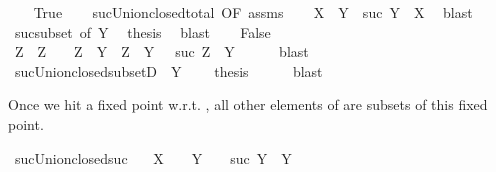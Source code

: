 \begin{isabellebody}
\ \ \isamarkupfalse%
\ True\isanewline
\ \ \isamarkupfalse%
\ suc{\isacharunderscore}{\kern0pt}Union{\isacharunderscore}{\kern0pt}closed{\isacharunderscore}{\kern0pt}total{\isacharprime}{\kern0pt}\ {\isacharbrackleft}{\kern0pt}OF\ assms{\isacharbrackright}{\kern0pt}\isanewline
\ \ \isamarkupfalse%
\ {\isachardoublequoteopen}X\ {\isasymsubseteq}\ Y\ {\isasymor}\ suc\ Y\ {\isasymsubseteq}\ X{\isachardoublequoteclose}\ \isamarkupfalse%
\ blast\isanewline
\ \ \isamarkupfalse%
\ suc{\isacharunderscore}{\kern0pt}subset\ {\isacharbrackleft}{\kern0pt}of\ Y{\isacharbrackright}{\kern0pt}\ \isamarkupfalse%
\ {\isacharquery}{\kern0pt}thesis\ \isamarkupfalse%
\ blast\isanewline
{}\isamarkupfalse%
\isanewline
\ \ \isamarkupfalse%
\ False\isanewline
\ \ \isamarkupfalse%
\ \isamarkupfalse%
\ Z\ \ {\isachardoublequoteopen}Z\ {\isasymin}\ {\isasymC}{\isachardoublequoteclose}\ \ {\isachardoublequoteopen}Z\ {\isasymsubseteq}\ Y{\isachardoublequoteclose}\ \ {\isachardoublequoteopen}Z\ {\isasymnoteq}\ Y{\isachardoublequoteclose}\ \ {\isachardoublequoteopen}{\isasymnot}\ suc\ Z\ {\isasymsubseteq}\ Y{\isachardoublequoteclose}\isanewline
\ \ \ \ \isamarkupfalse%
\ blast\isanewline
\ \ \isamarkupfalse%
\ suc{\isacharunderscore}{\kern0pt}Union{\isacharunderscore}{\kern0pt}closed{\isacharunderscore}{\kern0pt}subsetD\ \ {\isacartoucheopen}Y\ {\isasymin}\ {\isasymC}{\isacartoucheclose}\ \isamarkupfalse%
\ {\isacharquery}{\kern0pt}thesis\isanewline
\ \ \ \ \isamarkupfalse%
\ blast\isanewline
{}\isamarkupfalse%
%
\endisatagproof
{\isafoldproof}%
%
\isadelimproof
%
\endisadelimproof
%
\begin{isamarkuptext}%
Once we hit a fixed point w.r.t. , all other elements
  of \isa{{\isasymC}} are subsets of this fixed point.%
\end{isamarkuptext}\isamarkuptrue%
\isamarkupfalse%
\ suc{\isacharunderscore}{\kern0pt}Union{\isacharunderscore}{\kern0pt}closed{\isacharunderscore}{\kern0pt}suc{\isacharcolon}{\kern0pt}\isanewline
\ \ \ {\isachardoublequoteopen}X\ {\isasymin}\ {\isasymC}{\isachardoublequoteclose}\ \ {\isachardoublequoteopen}Y\ {\isasymin}\ {\isasymC}{\isachardoublequoteclose}\ \ {\isachardoublequoteopen}suc\ Y\ {\isacharequal}{\kern0pt}\ Y{\isachardoublequoteclose}\isanewline

\end{isabellebody}
